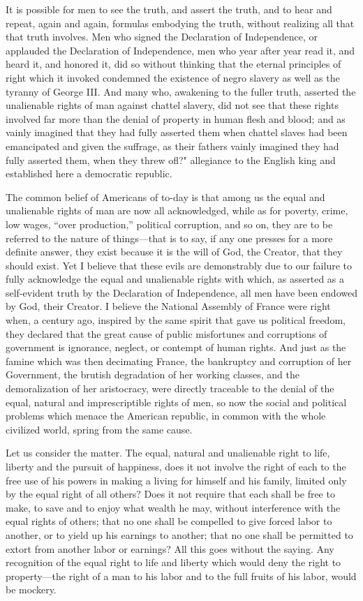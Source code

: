 \documentclass{book}
\begin{document}
It is possible for men to see the truth, and assert the truth, and to hear and repeat, again and again, formulas embodying the truth, without realizing all that that truth involves. Men who signed the Declaration of Independence, or applauded the Declaration of Independence, men who year after year read it, and heard it, and honored it, did so without thinking that the eternal principles of right which it invoked condemned the existence of negro slavery as well as the tyranny of George III. And many who, awakening to the fuller truth, asserted the unalienable rights of man against chattel slavery, did not see that these rights involved far more than the denial of property in human flesh and blood; and as vainly imagined that they had fully asserted them when chattel slaves had been emancipated and given the suffrage, as their fathers vainly imagined they had fully asserted them, when they threw ofl?" allegiance to the English king and established here a democratic republic.

The common belief of Americans of to-day is that among us the equal and unalienable rights of man are now all acknowledged, while as for poverty, crime, low wages, “over production,” political corruption, and so on, they are to be referred to the nature of things—that is to say, if any one presses for a more definite answer, they exist because it is the will of God, the Creator, that they should exist. Yet I believe that these evils are demonstrably due to our failure to fully acknowledge the equal and unalienable rights with which, as asserted as a self-evident truth by the Declaration of Independence, all men have been endowed by God, their Creator. I believe the National Assembly of France were right when, a century ago, inspired by the same spirit that gave us political freedom, they declared that the great cause of public misfortunes and corruptions of government is ignorance, neglect, or contempt of human rights. And just as the famine which was then decimating France, the bankruptcy and corruption of her Government, the brutish degradation of her working classes, and the demoralization of her aristocracy, were directly traceable to the denial of the equal, natural and imprescriptible rights of men, so now the social and political problems which menace the American republic, in common with the whole civilized world, spring from the same cause.

Let us consider the matter. The equal, natural and unalienable right to life, liberty and the pursuit of happiness, does it not involve the right of each to the free use of his powers in making a living for himself and his family, limited only by the equal right of all others? Does it not require that each shall be free to make, to save and to enjoy what wealth he may, without interference with the equal rights of others; that no one shall be compelled to give forced labor to another, or to yield up his earnings to another; that no one shall be permitted to extort from another labor or earnings? All this goes without the saying. Any recognition of the equal right to life and liberty which would deny the right to property—the right of a man to his labor and to the full fruits of his labor, would be mockery.
\end{document}
